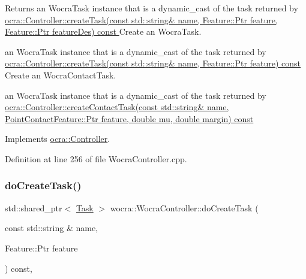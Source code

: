 \begin{DoxyReturn}{Returns}
an Wocra\+Task instance that is a dynamic\+\_\+cast of the task returned by \hyperlink{classocra_1_1Controller_ae57beb4834bb1ed3a2ed292df5e8aedf}{ocra\+::\+Controller\+::create\+Task(const std\+::string\& name, Feature\+::\+Ptr feature, Feature\+::\+Ptr feature\+Des) const }Create an Wocra\+Task.

an Wocra\+Task instance that is a dynamic\+\_\+cast of the task returned by \hyperlink{classocra_1_1Controller_ae3546bd282b1bec068d416e06660722f}{ocra\+::\+Controller\+::create\+Task(const std\+::string\& name, Feature\+::\+Ptr feature) const }Create an Wocra\+Contact\+Task.

an Wocra\+Task instance that is a dynamic\+\_\+cast of the task returned by \hyperlink{classocra_1_1Controller_af1d9bb73b939a5377a3dba072ce4c08a}{ocra\+::\+Controller\+::create\+Contact\+Task(const std\+::string\& name, Point\+Contact\+Feature\+::\+Ptr feature, double mu, double margin) const} 
\end{DoxyReturn}


Implements \hyperlink{classocra_1_1Controller_a05f6d757e4125a71bf766df7f069ac43}{ocra\+::\+Controller}.



Definition at line 256 of file Wocra\+Controller.\+cpp.

\hypertarget{classwocra_1_1WocraController_a1dec71e9c2fb5b2d6fab0bcd230e9c00}{}\label{classwocra_1_1WocraController_a1dec71e9c2fb5b2d6fab0bcd230e9c00} 
\subsubsection{\texorpdfstring{do\+Create\+Task()}{doCreateTask()}\hspace{0.1cm}{\footnotesize\ttfamily [2/2]}}
{\footnotesize\ttfamily std\+::shared\+\_\+ptr$<$ \hyperlink{classocra_1_1Task}{Task} $>$ wocra\+::\+Wocra\+Controller\+::do\+Create\+Task (\begin{DoxyParamCaption}\item[{const std\+::string \&}]{name,  }\item[{Feature\+::\+Ptr}]{feature }\end{DoxyParamCaption}) const\hspace{0.3cm}{\ttfamily [protected]}, {\ttfamily [virtual]}}

